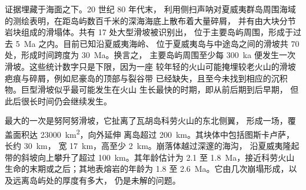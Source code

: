 证据埋藏于海面之下。20 世纪 80 年代末，
利用侧扫声呐对夏威夷群岛周围海域的测绘表明，在距岛屿数百千米的深海海底上散布着大量碎屑，
并有由大块分节岩块组成的滑塌体。共有 17 处大型滑坡被识别出，
位于主要岛屿周围，形成于过去 \qty{5}{Ma} 之内。目前已知沿夏威夷海岭、
位于夏威夷岛与中途岛之间的滑坡共 70 处，形成时间跨度为 \qty{30}{Ma}。换言之，
主要岛屿周围至少每 \qty{300}{ka} 便发生一次滑坡。这些统计数字只是下限，因为一座
较年轻的火山可能掩埋较老火山的滑坡疤痕与碎屑，例如尼豪岛的顶部与裂谷带
已经缺失，且至今未找到相应的沉积物。巨型滑坡似乎最可能发生在火山
生长最快的时期，即从前后期到后早期，
但此后很长时间仍会继续发生。

最大的一次是努阿努滑坡，它扯离了瓦胡岛科劳火山的东北侧翼，
形成一场，覆盖面积达 \qty{23000}{km^2}，向外延伸
离岛超过 \qty{200}{km}。其块体中包括图斯卡卢萨，长约 \qty{30}{km}，
宽 \qty{17}{km}，高至少 \qty{2}{km}。崩落体越过深邃的海沟，
沿夏威夷隆起带的斜坡向上攀升了超过 \qty{100}{km}。其年龄估计为 2.1 至
\qty{1.8}{Ma}，接近科劳火山生命的末期或之后；其地表熔岩的年龄为 1.8 至
\qty{2.6}{Ma}。它由几次崩塌形成，以及远离岛屿处的厚度有多大，
仍是未解的问题。

